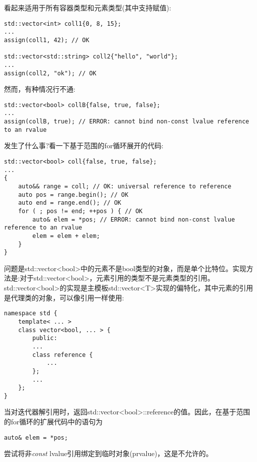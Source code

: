 看起来适用于所有容器类型和元素类型(其中支持赋值):\par

\begin{lstlisting}[caption={}]
std::vector<int> coll1{0, 8, 15};
...
assign(coll1, 42); // OK

std::vector<std::string> coll2{"hello", "world"};
...
assign(coll2, "ok"); // OK
\end{lstlisting}

然而，有种情况行不通:\par

\begin{lstlisting}[caption={}]
std::vector<bool> collB{false, true, false};
...
assign(collB, true); // ERROR: cannot bind non-const lvalue reference to an rvalue
\end{lstlisting}

发生了什么事?看一下基于范围的for循环展开的代码:\par

\begin{lstlisting}[caption={}]
std::vector<bool> coll{false, true, false};
...
{
	auto&& range = coll; // OK: universal reference to reference
	auto pos = range.begin(); // OK
	auto end = range.end(); // OK
	for ( ; pos != end; ++pos ) { // OK
		auto& elem = *pos; // ERROR: cannot bind non-const lvalue reference to an rvalue
		elem = elem + elem;
	}
}
\end{lstlisting}

问题是std::vector<bool>中的元素不是bool类型的对象，而是单个比特位。实现方法是:对于std::vector<bool>，元素引用的类型不是元素类型的引用。std::vector<bool>的实现是主模板std::vector<T>实现的偏特化，其中元素的引用是代理类的对象，可以像引用一样使用:\par

\begin{lstlisting}[caption={}]
namespace std {
	template< ... >
	class vector<bool, ... > {
		public:
		...
		class reference {
			...
		};
		...
	};
}
\end{lstlisting}

当对迭代器解引用时，返回std::vector<bool>::reference的值。因此，在基于范围的for循环的扩展代码中的语句为\par

\begin{lstlisting}[caption={}]
auto& elem = *pos;
\end{lstlisting}

尝试将非\textit{const} lvalue引用绑定到临时对象(prvalue)，这是不允许的。\par

